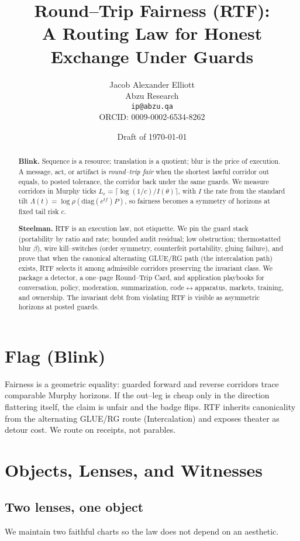 \documentclass[11pt]{article}
\title{\vspace{-1em}Round--Trip Fairness (RTF):\\
A Routing Law for Honest Exchange Under Guards\\[0.25em]
}
\author{Jacob Alexander Elliott\\
Abzu Research\\
\texttt{ip@abzu.qa}\\
ORCID: 0009-0002-6534-8262}
\date{Draft of \today}
\begin{document}
\maketitle

\begin{abstract}
\noindent
\textbf{Blink.} Sequence is a resource; translation is a quotient; blur is the price of execution. A message, act, or artifact is \emph{round--trip fair} when the shortest lawful corridor out equals, to posted tolerance, the corridor back under the same guards. We measure corridors in Murphy ticks $L_c=\lceil\log(1/c)/I(\theta)\rceil$, with $I$ the rate from the standard tilt $\Lambda(t)=\log\rho(\mathrm{diag}(e^{tf})P)$, so fairness becomes a symmetry of horizons at fixed tail risk $c$.

\smallskip
\textbf{Steelman.} RTF is an execution law, not etiquette. We pin the guard stack (portability by ratio and rate; bounded audit residual; low obstruction; thermostatted blur $\beta$), wire kill--switches (order symmetry, counterfeit portability, gluing failure), and prove that when the canonical alternating GLUE/RG path (the intercalation path) exists, RTF selects it among admissible corridors preserving the invariant class. We package a detector, a one--page Round--Trip Card, and application playbooks for conversation, policy, moderation, summarization, code$\leftrightarrow$apparatus, markets, training, and ownership. The invariant debt from violating RTF is visible as asymmetric horizons at posted guards.\\[-0.5em]
\end{abstract}

\tableofcontents

\section{Flag (Blink)}
Fairness is a geometric equality: guarded forward and reverse corridors trace comparable Murphy horizons. If the out--leg is cheap only in the direction flattering itself, the claim is unfair and the badge flips. RTF inherits canonicality from the alternating GLUE/RG route (Intercalation) and exposes theater as detour cost. We route on receipts, not parables.

\section{Objects, Lenses, and Witnesses}
\subsection{Two lenses, one object}
We maintain two faithful charts so the law does not depend on an aesthetic.
\end{document}
